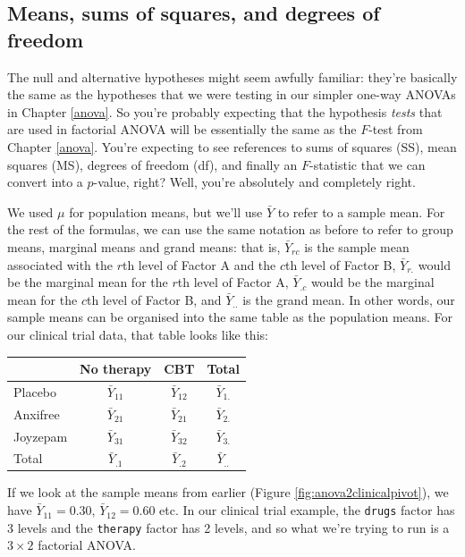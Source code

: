 \documentclass[
]{book}
\theoremstyle{definition}
\theoremstyle{definition}
\theoremstyle{definition}
\theoremstyle{definition}
\theoremstyle{remark}
\begin{document}
\hypertarget{means-sums-of-squares-and-degrees-of-freedom}{%
\subsection{Means, sums of squares, and degrees of freedom}\label{means-sums-of-squares-and-degrees-of-freedom}}

The null and alternative hypotheses might seem awfully familiar: they're basically the same as the hypotheses that we were testing in our simpler one-way ANOVAs in Chapter \ref{anova}. So you're probably expecting that the hypothesis \emph{tests} that are used in factorial ANOVA will be essentially the same as the \(F\)-test from Chapter \ref{anova}. You're expecting to see references to sums of squares (SS), mean squares (MS), degrees of freedom (df), and finally an \(F\)-statistic that we can convert into a \(p\)-value, right? Well, you're absolutely and completely right.

We used \(\mu\) for population means, but we'll use \(\bar{Y}\) to refer to a sample mean. For the rest of the formulas, we can use the same notation as before to refer to group means, marginal means and grand means: that is, \(\bar{Y}_{rc}\) is the sample mean associated with the \(r\)th level of Factor A and the \(c\)th level of Factor B, \(\bar{Y}_{r.}\) would be the marginal mean for the \(r\)th level of Factor A, \(\bar{Y}_{.c}\) would be the marginal mean for the \(c\)th level of Factor B, and \(\bar{Y}_{..}\) is the grand mean. In other words, our sample means can be organised into the same table as the population means. For our clinical trial data, that table looks like this:

\begin{longtable}[]{@{}lccc@{}}
\toprule()
& No therapy & CBT & Total \\
\midrule()
\endhead
Placebo & \(\bar{Y}_{11}\) & \(\bar{Y}_{12}\) & \(\bar{Y}_{1.}\) \\
Anxifree & \(\bar{Y}_{21}\) & \(\bar{Y}_{21}\) & \(\bar{Y}_{2.}\) \\
Joyzepam & \(\bar{Y}_{31}\) & \(\bar{Y}_{32}\) & \(\bar{Y}_{3.}\) \\
Total & \(\bar{Y}_{.1}\) & \(\bar{Y}_{.2}\) & \(\bar{Y}_{..}\) \\
\bottomrule()
\end{longtable}

If we look at the sample means from earlier (Figure \ref{fig:anova2clinicalpivot}), we have \(\bar{Y}_{11} = 0.30\), \(\bar{Y}_{12} = 0.60\) etc. In our clinical trial example, the \texttt{drugs} factor has 3 levels and the \texttt{therapy} factor has 2 levels, and so what we're trying to run is a \(3 \times 2\) factorial ANOVA.
\end{document}
